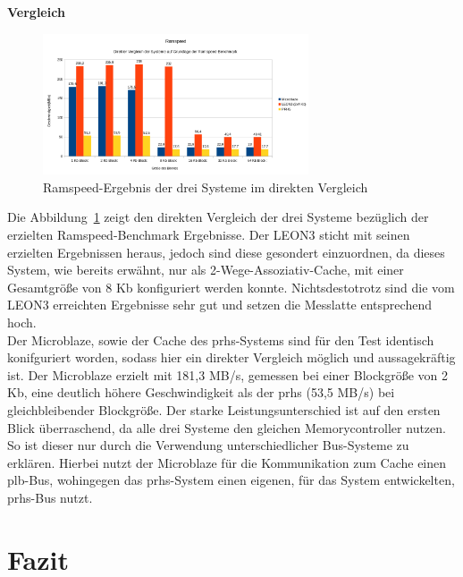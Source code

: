 \textbf{Vergleich}

\begin{figure}[H]
\centering
\includegraphics[width=0.7\textwidth]{Hauptteil/ramspeedresult.png}
\caption{Ramspeed-Ergebnis der drei Systeme im direkten Vergleich}
\label{fig:ramspeedresult}
\end{figure}

Die Abbildung~\ref{fig:ramspeedresult} zeigt den direkten Vergleich der drei Systeme bezüglich der erzielten Ramspeed-Benchmark Ergebnisse. Der LEON3 sticht mit seinen erzielten Ergebnissen
heraus, jedoch sind diese gesondert einzuordnen, da dieses System, wie bereits erwähnt, nur als 2-Wege-Assoziativ-Cache, mit einer Gesamtgröße von 8 Kb konfiguriert werden konnte. Nichtsdestotrotz
sind die vom LEON3 erreichten Ergebnisse sehr gut und setzen die Messlatte entsprechend hoch.\\
Der Microblaze, sowie der Cache des \ac{prhs}-Systems sind für den Test identisch konifguriert worden, sodass hier ein direkter Vergleich möglich und aussagekräftig ist.
Der Microblaze erzielt mit 181,3 MB/s, gemessen bei einer Blockgröße von 2 Kb, eine deutlich höhere Geschwindigkeit als der \ac{prhs} (53,5 MB/s) bei gleichbleibender Blockgröße.
Der starke Leistungsunterschied ist auf den ersten Blick überraschend, da alle drei Systeme den gleichen Memorycontroller nutzen. So ist dieser nur durch die Verwendung unterschiedlicher
Bus-Systeme zu erklären. Hierbei nutzt der Microblaze für die Kommunikation zum Cache einen \ac{plb}-Bus, wohingegen das \ac{prhs}-System einen eigenen, für das System entwickelten,
\ac{prhs}-Bus nutzt.

\chapter{Fazit}\label{kap:fazit}

